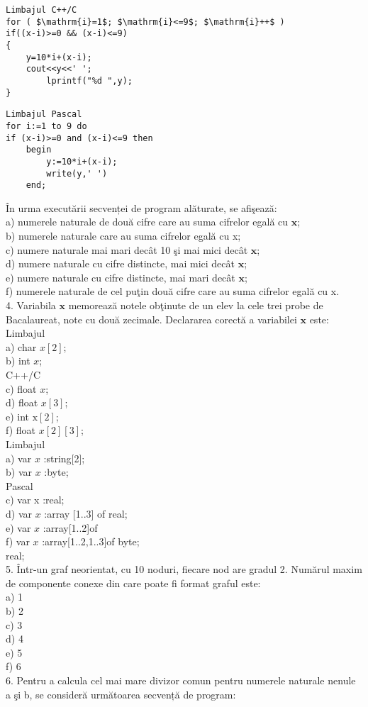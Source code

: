 \begin{verbatim}
Limbajul C++/C
for ( $\mathrm{i}=1$; $\mathrm{i}<=9$; $\mathrm{i}++$ )
if((x-i)>=0 && (x-i)<=9)
{
    y=10*i+(x-i);
    cout<<y<<' ';
        lprintf("%d ",y);
}
\end{verbatim}

\begin{verbatim}
Limbajul Pascal
for i:=1 to 9 do
if (x-i)>=0 and (x-i)<=9 then
    begin
        y:=10*i+(x-i);
        write(y,' ')
    end;
\end{verbatim}

În urma executării secvenței de program alăturate, se afişează:\\
a) numerele naturale de două cifre care au suma cifrelor egală cu $\mathbf{x}$;\\
b) numerele naturale care au suma cifrelor egală cu x;\\
c) numere naturale mai mari decât 10 şi mai mici decât $\mathbf{x}$;\\
d) numere naturale cu cifre distincte, mai mici decât $\mathbf{x}$;\\
e) numere naturale cu cifre distincte, mai mari decât $\mathbf{x}$;\\
f) numerele naturale de cel puţin două cifre care au suma cifrelor egală cu x.\\
4. Variabila $\mathbf{x}$ memorează notele obţinute de un elev la cele trei probe de Bacalaureat, note cu două zecimale. Declararea corectă a variabilei $\mathbf{x}$ este:\\
Limbajul\\
a) char $x[2]$;\\
b) int $x$;\\
C++/C\\
c) float $x$;\\
d) float $x[3]$;\\
e) int $\mathrm{x}[2]$;\\
f) float $x[2][3]$;\\
Limbajul\\
a) var $x$ :string[2];\\
b) var $x$ :byte;\\
Pascal\\
c) var x :real;\\
d) var $x$ :array [1..3] of real;\\
e) var $x$ :array[1..2]of\\
f) var $x$ :array[1..2,1..3]of byte;\\
real;\\
5. Într-un graf neorientat, cu 10 noduri, fiecare nod are gradul 2. Numărul maxim de componente conexe din care poate fi format graful este:\\
a) 1\\
b) 2\\
c) 3\\
d) 4\\
e) 5\\
f) 6\\
6. Pentru a calcula cel mai mare divizor comun pentru numerele naturale nenule a şi b, se consideră următoarea secvență de program:

